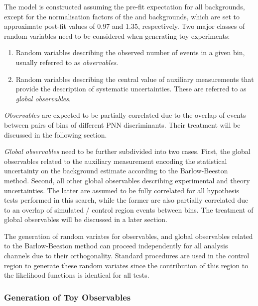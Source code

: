 The model is constructed assuming the pre-fit expectation for all
backgrounds, except for the normalisation factors of the \ttbar and
\ZHF backgrounds, which are set to approximate post-fit values of 0.97
and 1.35, respectively. Two major classes of random variables need to
be considered when generating toy experiments:
\begin{enumerate}
\item Random variables describing the observed number of events in a given
  bin, usually referred to as \emph{observables}.

\item Random variables describing the central value of auxiliary
  measurements that provide the description of systematic
  uncertainties. These are referred to as \emph{global observables}.
\end{enumerate}

\emph{Observables} are expected to be partially correlated due to the
overlap of events between pairs of bins of different PNN
discriminants. Their treatment will be discussed in the following
section.

\emph{Global observables} need to be further subdivided into two
cases. First, the global observables related to the auxiliary
measurement encoding the statistical uncertainty on the background
estimate %
according to the Barlow-Beeston method. Second, all other global
observables describing experimental and theory uncertainties. The
latter are assumed to be fully correlated for all hypothesis tests
performed in this search, while the former are also partially
correlated due to an overlap of simulated / control region events
between bins. The treatment of global observables will be discussed in
a later section.

The generation of random variates for observables, and global
observables related to the Barlow-Beeston method can proceed
independently for all analysis channels due to their
orthogonality. Standard procedures are used in the control region to
generate these random variates since the contribution of this region
to the likelihood functions is identical for all tests.


\subsubsection{Generation of Toy Observables}

